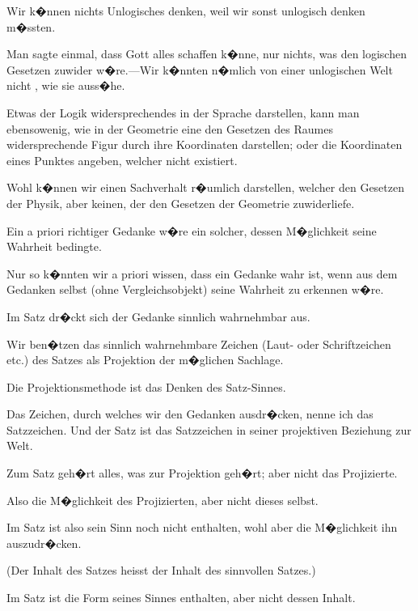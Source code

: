 {Wir k�nnen nichts Unlogisches denken, weil
wir sonst unlogisch denken m�ssten.}


{Man sagte einmal, dass Gott alles schaffen
k�nne, nur nichts, was den logischen Gesetzen
zuwider w�re.---Wir k�nnten n�mlich von einer
\glqq{}unlogischen\grqq{} Welt nicht , wie sie auss�he.}


{Etwas \glqq{}der Logik widersprechendes\grqq{} in der
Sprache darstellen, kann man ebensowenig, wie
in der Geometrie eine den Gesetzen des Raumes
widersprechende Figur durch ihre Koordinaten
darstellen; oder die Koordinaten eines Punktes
angeben, welcher nicht existiert.}


{Wohl k�nnen wir einen Sachverhalt r�umlich
darstellen, welcher den Gesetzen der Physik,
aber keinen, der den Gesetzen der Geometrie
zuwiderliefe.}


{Ein a priori richtiger Gedanke w�re ein solcher,
dessen M�glichkeit seine Wahrheit bedingte.}


{Nur so k�nnten wir a priori wissen, dass ein
Gedanke wahr ist, wenn aus dem Gedanken
selbst (ohne Vergleichsobjekt) seine Wahrheit
zu erkennen w�re.}


{Im Satz dr�ckt sich der Gedanke sinnlich
wahrnehmbar aus.}


{{\stretchyspace
Wir ben�tzen das sinnlich wahrnehmbare
Zeichen (Laut- oder Schriftzeichen etc.) des Satzes
als Projektion der m�glichen Sachlage.}

Die Projektionsmethode ist das Denken des
Satz-Sinnes.}


{Das Zeichen, durch welches wir den Gedanken
ausdr�cken, nenne ich das Satzzeichen. Und der
Satz ist das Satzzeichen in seiner projektiven
Beziehung zur Welt.}


{Zum Satz geh�rt alles, was zur Projektion
geh�rt; aber nicht das Projizierte.

Also die M�glichkeit des Projizierten, aber nicht
dieses selbst.

Im Satz ist also sein Sinn noch nicht enthalten,
wohl aber die M�glichkeit ihn auszudr�cken.

(\glqq{}Der Inhalt des Satzes\grqq{} heisst der Inhalt des
sinnvollen Satzes.)

Im Satz ist die Form seines Sinnes enthalten,
aber nicht dessen Inhalt.}


